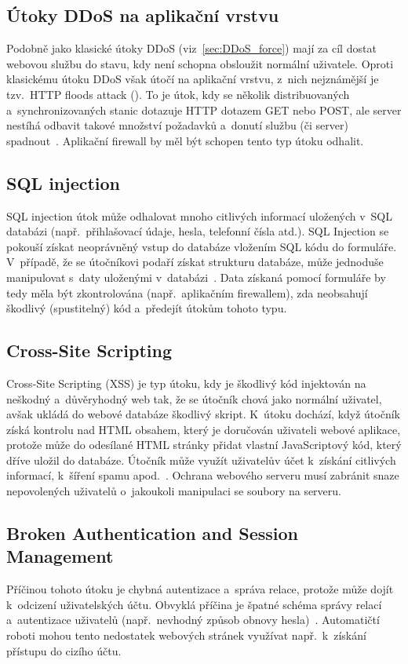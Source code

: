 \subsection*{Útoky DDoS na aplikační vrstvu}
Podobně jako klasické útoky DDoS (viz~\ref{sec:DDoS_force}) mají za cíl dostat webovou službu do stavu, kdy není schopna obsloužit normální uživatele. Oproti klasickému útoku DDoS však útočí na aplikační vrstvu, z~nich nejznámější je tzv.~HTTP floods attack (). To je útok, kdy se několik distribuovaných a~synchronizovaných stanic dotazuje HTTP dotazem GET nebo POST, ale server nestíhá odbavit takové množství požadavků a~donutí službu (či server) spadnout~\cite{bib:HTTP_flood}. Aplikační firewall by měl být schopen tento typ útoku odhalit.

\subsection*{SQL injection}
SQL injection útok může odhalovat mnoho citlivých informací uložených v~SQL databázi (např.~přihlašovací údaje, hesla, telefonní čísla atd.). SQL Injection se pokouší získat neoprávněný vstup do databáze vložením SQL kódu do formuláře. V~případě, že se útočníkovi podaří získat strukturu databáze, může jednoduše manipulovat s~daty uloženými v~databázi~\cite{bib:SQL_injection}. Data získaná pomocí formuláře by tedy měla být zkontrolována (např.~aplikačním firewallem), zda neobsahují škodlivý (spustitelný) kód a~předejít útokům tohoto typu.

\subsection*{Cross-Site Scripting}
Cross-Site Scripting (XSS) je typ útoku, kdy je škodlivý kód injektován na neškodný a~důvěryhodný web tak, že se útočník chová jako normální uživatel, avšak ukládá do webové databáze škodlivý skript. K~útoku dochází, když útočník získá kontrolu nad HTML obsahem, který je doručován uživateli webové aplikace, protože může do odesílané HTML stránky přidat vlastní JavaScriptový kód, který dříve uložil do databáze. Útočník může využít uživatelův účet k~získání citlivých informací, k~šíření spamu apod.~\cite{bib:XSS, bib:XSS_vut}. Ochrana webového serveru musí zabránit snaze nepovolených uživatelů o~jakoukoli manipulaci se soubory na serveru.

\subsection*{Broken Authentication and Session Management}
Příčinou tohoto útoku je chybná autentizace a~správa relace, protože může dojít k~odcizení uživatelských účtu. Obvyklá příčina je špatné schéma správy relací a~autentizace uživatelů (např.~nevhodný způsob obnovy hesla)~\cite{bib:XSS_vut}. Automatičtí roboti mohou tento nedostatek webových stránek využívat např.~k~získání přístupu do cizího účtu.

